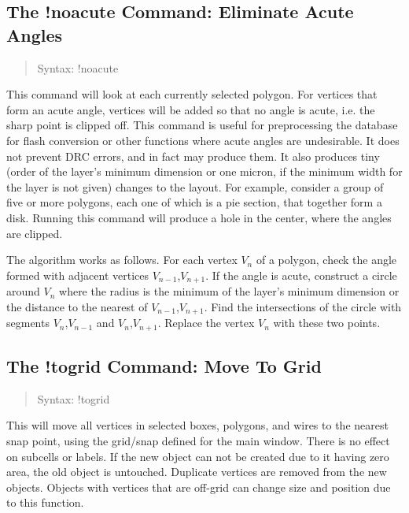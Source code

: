 \subsection{The {\cb !noacute} Command: Eliminate Acute Angles}
\begin{quote}
Syntax: {\vt !noacute}
\end{quote}
This command will look at each currently selected polygon.  For
vertices that form an acute angle, vertices will be added so that no
angle is acute, i.e.  the sharp point is clipped off.  This command is
useful for preprocessing the database for flash conversion or other
functions where acute angles are undesirable.  It does not prevent DRC
errors, and in fact may produce them.  It also produces tiny (order of
the layer's minimum dimension or one micron, if the minimum width for
the layer is not given) changes to the layout.  For example, consider
a group of five or more polygons, each one of which is a pie section,
that together form a disk.  Running this command will produce a hole
in the center, where the angles are clipped.

The algorithm works as follows.  For each vertex $V_n$ of a polygon,
check the angle formed with adjacent vertices $V_{n-1}$,$V_{n+1}$.  If
the angle is acute, construct a circle around $V_n$ where the radius
is the minimum of the layer's minimum dimension or the distance to the
nearest of $V_{n-1}$,$V_{n+1}$.  Find the intersections of the circle
with segments $V_n$,$V_{n-1}$ and $V_n$,$V_{n+1}$.  Replace the vertex
$V_n$ with these two points.

\subsection{The {\cb !togrid} Command: Move To Grid}
\begin{quote}
Syntax: {\vt !togrid}
\end{quote}
This will move all vertices in selected boxes, polygons, and wires to
the nearest snap point, using the grid/snap defined for the main
window.  There is no effect on subcells or labels.  If the new object
can not be created due to it having zero area, the old object is
untouched.  Duplicate vertices are removed from the new objects. 
Objects with vertices that are off-grid can change size and position
due to this function.

